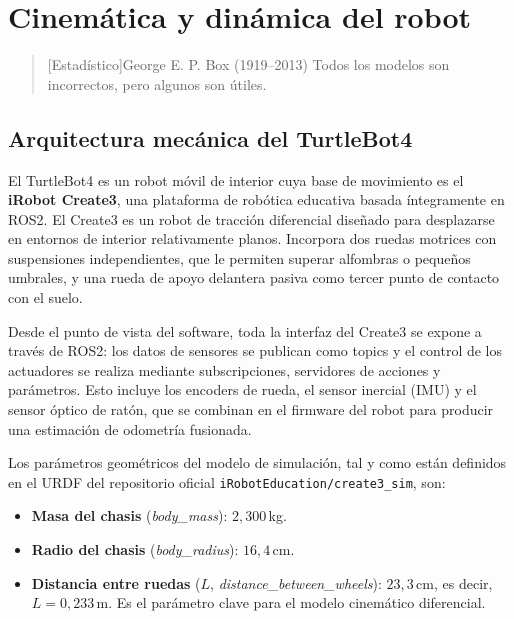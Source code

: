 \chapter{Cinemática y dinámica del robot}

\begin{quotation}[Estadístico]{George E. P. Box (1919--2013)}
Todos los modelos son incorrectos, pero algunos son útiles.
\end{quotation}

\begin{abstract}
Este capítulo describe el modelo cinemático y dinámico del TurtleBot4, con el objetivo de entender cómo se traducen las órdenes de movimiento en desplazamiento real. Se analiza la arquitectura mecánica del robot, su modelo diferencial de tracción, las ecuaciones de cinemática directa e inversa y las limitaciones físicas impuestas por el firmware que condicionan la planificación de trayectorias.
\end{abstract}

\section{Arquitectura mecánica del TurtleBot4}

El TurtleBot4 es un robot móvil de interior cuya base de movimiento es el \textbf{iRobot Create3}, una plataforma de robótica educativa basada íntegramente en ROS2. El Create3 es un robot de tracción diferencial diseñado para desplazarse en entornos de interior relativamente planos. Incorpora dos ruedas motrices con suspensiones independientes, que le permiten superar alfombras o pequeños umbrales, y una rueda de apoyo delantera pasiva como tercer punto de contacto con el suelo.

Desde el punto de vista del software, toda la interfaz del Create3 se expone a través de ROS2: los datos de sensores se publican como topics y el control de los actuadores se realiza mediante subscripciones, servidores de acciones y parámetros. Esto incluye los encoders de rueda, el sensor inercial (IMU) y el sensor óptico de ratón, que se combinan en el firmware del robot para producir una estimación de odometría fusionada.

Los parámetros geométricos del modelo de simulación, tal y como están definidos en el URDF del repositorio oficial \texttt{iRobotEducation/create3\_sim}, son:

\begin{itemize}
    \item \textbf{Masa del chasis} (\textit{body\_mass}): $2{,}300$\,kg.
    \item \textbf{Radio del chasis} (\textit{body\_radius}): $16{,}4$\,cm.
    \item \textbf{Distancia entre ruedas} ($L$, \textit{distance\_between\_wheels}): $23{,}3$\,cm, es decir, $L = 0{,}233$\,m. Es el parámetro clave para el modelo cinemático diferencial.
\end{itemize}

